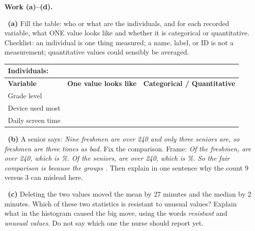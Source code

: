 \documentclass[11pt]{article}
\begin{document}
\newpage
\setlength{\parskip}{4pt}
\textbf{Work (a)--(d).}\par\smallskip

~\textbf{(a)} Fill the table: who or what are the individuals, and for each recorded variable, what ONE value looks like and whether it is categorical or quantitative. Checklist: an individual is one thing measured; a name, label, or ID is not a measurement; quantitative values could sensibly be averaged.\par\smallskip \begin{tabular}{|p{1.3in}|p{2.2in}|p{1.6in}|}\hline \textbf{Individuals:} & \multicolumn{2}{l|}{\hrulefill} \\ \hline \textbf{Variable} & \textbf{One value looks like} & \textbf{Categorical / Quantitative} \\ \hline Grade level & & \\[10pt] \hline Device used most & & \\[10pt] \hline Daily screen time & & \\[10pt] \hline \end{tabular}\par
{}

~\textbf{(b)} A senior says: \emph{Nine freshmen are over 240 and only three seniors are, so freshmen are three times as bad.} Fix the comparison. Frame: \emph{Of the \underline{\hspace{0.4in}} freshmen, \underline{\hspace{0.4in}} are over 240, which is \underline{\hspace{0.4in}}\%. Of the \underline{\hspace{0.4in}} seniors, \underline{\hspace{0.4in}} are over 240, which is \underline{\hspace{0.4in}}\%. So the fair comparison is \underline{\hspace{0.9in}} because the groups \underline{\hspace{0.9in}}.} Then explain in one sentence why the count 9 versus 3 can mislead here.\par
{}

~\textbf{(c)} Deleting the two values moved the mean by 27 minutes and the median by 2 minutes. Which of these two statistics is resistant to unusual values? Explain what in the histogram caused the big move, using the words \emph{resistant} and \emph{unusual values}. Do not say which one the nurse should report yet.\par
{}
\end{document}
